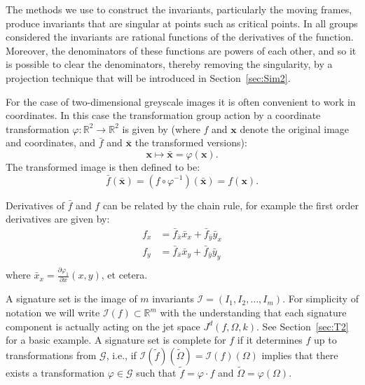 \documentclass[review,onefignum,onetabnum]{siamonline190516}
\begin{document}
The methods we use to construct the invariants, particularly the moving frames, produce invariants that are singular at points such as critical points. In all groups considered the invariants are rational functions of the derivatives of the function. Moreover, the denominators of these functions are powers of each other, and so it is possible to clear the denominators, thereby removing the singularity, by a projection technique that will be introduced in Section~\ref{sec:Sim2}.

For the case of two-dimensional greyscale images it is often convenient to work in coordinates. In this case the transformation group action by a coordinate transformation $\varphi \colon \mathbb{R}^2 \to \mathbb{R}^2$ is given by (where $f$ and $\mathbf{x}$ denote the original image and coordinates, and $\bar{f}$ and $\bar{\mathbf{x}}$ the transformed versions):
\begin{equation}\label{eq:transformation}
  \mathbf{x} \mapsto \bar{\mathbf{x}} = \varphi(\mathbf{x}).
\end{equation}
The transformed image is then defined to be:
\begin{equation}\label{eq:fbarequalsf}
  \bar{f}(\bar{\mathbf{x}}) = (f\circ\varphi^{-1})(\bar{\mathbf{x}}) = f(\mathbf{x}).
\end{equation}

Derivatives of $\bar{f}$ and $f$ can be related by the chain rule, for example the first order derivatives are given by:
\begin{equation}\label{eq:prolongation}
  \begin{aligned}
    f_x &= \bar{f}_{\bar{x}} \bar{x}_x + \bar{f}_{\bar{y}}\bar{y}_x \\
    f_y &= \bar{f}_{\bar{x}} \bar{x}_y + \bar{f}_{\bar{y}}\bar{y}_y \\
  \end{aligned}
\end{equation}
where $\bar{x}_x = \frac{\partial \varphi_1}{\partial x}(x, y)$, et cetera. %

A signature set is the image of $m$ invariants
$\mathcal{I}=(I_1,I_2,\dots,I_m)$. For simplicity of notation we will write
$\mathcal{I}(f) \subset \mathbb{R}^m$ with the understanding that each signature component is
actually acting on the jet space $J^d(f, \Omega, k)$. See Section~\ref{sec:T2} for a basic
example. A signature set is complete for $f$ if it determines $f$ up to
transformations from $\mathcal{G}$, i.e., if $\mathcal{I}(\tilde
f)(\tilde\Omega) = \mathcal{I}(f)(\Omega)$ implies that there exists a
transformation $\varphi\in \mathcal{G}$ such that $\tilde f = \varphi\cdot f$
and $\tilde \Omega = \varphi(\Omega)$. 
\end{document}
